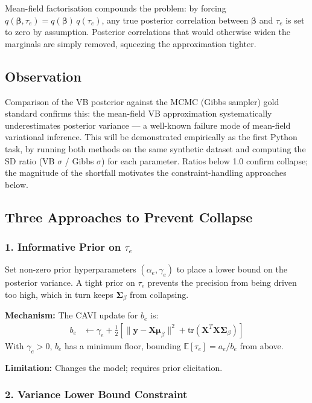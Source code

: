 \documentclass[11pt]{article}
\begin{document}
Mean-field factorisation compounds the problem: by forcing $q(\bm{\beta}, \tau_e) = q(\bm{\beta})\,q(\tau_e)$, any true posterior correlation between $\bm{\beta}$ and $\tau_e$ is set to zero by assumption. Posterior correlations that would otherwise widen the marginals are simply removed, squeezing the approximation tighter.

\subsection*{Observation}

Comparison of the VB posterior against the MCMC (Gibbs sampler) gold standard confirms this: the mean-field VB approximation systematically underestimates posterior variance --- a well-known failure mode of mean-field variational inference. This will be demonstrated empirically as the first Python task, by running both methods on the same synthetic dataset and computing the SD ratio (VB $\sigma$ / Gibbs $\sigma$) for each parameter. Ratios below 1.0 confirm collapse; the magnitude of the shortfall motivates the constraint-handling approaches below.

\subsection*{Three Approaches to Prevent Collapse}

\subsubsection*{1. Informative Prior on $\tau_e$}

Set non-zero prior hyperparameters $(\alpha_e, \gamma_e)$ to place a lower bound on the posterior variance. A tight prior on $\tau_e$ prevents the precision from being driven too high, which in turn keeps $\bm{\Sigma}_\beta$ from collapsing.

\textbf{Mechanism:} The CAVI update for $b_e$ is:
\begin{align}
  b_e &\leftarrow \gamma_e + \frac{1}{2}\left[\|\bm{y} - \bm{X}\bm{\mu}_\beta\|^2 + \mathrm{tr}(\bm{X}^T\bm{X}\bm{\Sigma}_\beta)\right]
\end{align}
With $\gamma_e > 0$, $b_e$ has a minimum floor, bounding $\mathbb{E}[\tau_e] = a_e/b_e$ from above.

\textbf{Limitation:} Changes the model; requires prior elicitation.

\subsubsection*{2. Variance Lower Bound Constraint}
\end{document}
